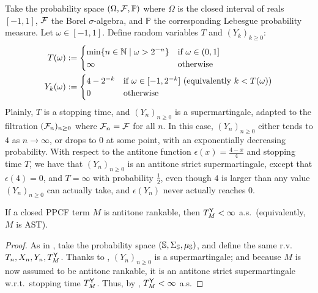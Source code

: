 \begin{example}
Take the probability space $(\Omega, \mathcal{F}, \mathbb{P})$ where $\Omega$ is the closed interval of reals $[-1, 1]$, $\mathcal{F}$ the Borel $\sigma$-algebra, and $\mathbb{P}$ the corresponding Lebesgue probability measure.
Let $\omega \in [-1, 1]$. Define random variables $T$ and $(Y_k)_{k \geq 0}$:
\begin{align*}
T(\omega) & := 
\begin{cases}
\min\{n \in \mathbb{N} \mid \omega > 2^{-n}\} & \hbox{if $\omega \in (0, 1]$}\\
\infty & \hbox{otherwise}
\end{cases} 
\\
Y_k(\omega) & := 
\begin{cases}
4-2^{-k} & \hbox{if $\omega \in [-1, 2^{-k}]$ (equivalently $k < T(\omega)$)}\\
0 & \hbox{otherwise}
\end{cases} 
\end{align*}
Plainly, $T$ is a stopping time, and $(Y_n)_{n \geq 0}$ is a supermartingale, adapted to the filtration $(\mathcal{F}_n)_{n \geq 0}$ where $\mathcal{F}_n = \mathcal{F}$ for all $n$. 
In this case, $(Y_n)_{n \geq 0}$ either tends to $4$ as $n \to \infty$, or drops to 0 at some point, with an exponentially decreasing probability. 
With respect to the antitone function $\epsilon(x) = \frac{4-x}{4}$ and stopping time $T$, we have that $(Y_n)_{n \geq 0}$ is an antitone strict supermartingale, except that $\epsilon(4) = 0$, and $T = \infty$ with probability $\frac 1 2$, even though $4$ is larger than any value $(Y_n)_{n \geq 0}$ can actually take, and $\epsilon(Y_n)$ never actually reaches $0$.
\end{example}


\begin{theorem} \label{thm:antitone rankable implies termination}
If a closed PPCF term $M$ is antitone rankable, then $T_M^{\mathsf{Y}} < \infty$ a.s.~(equivalently, $M$ is AST).
\end{theorem}
\begin{proof}
As in %
,
take the probability space $({\mathbb{S}}, \Sigma_{\mathbb{S}}, \mu_{\mathbb{S}})$, and define the same r.v.~$T_n, X_n, Y_n, T_M^{\mathsf{Y}}$. 
Thanks to , $(Y_n)_{n \geq 0}$ is a supermartingale; and because $M$ is now assumed to be antitone rankable, it is an antitone strict supermartingale w.r.t.~stopping time $T_M^{\mathsf{Y}}$. 
Thus, by , $T_M^{\mathsf{Y}} < \infty$ a.s.
\end{proof}

